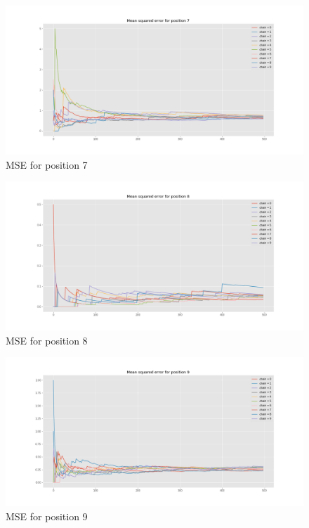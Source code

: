 \documentclass[]{article}
\begin{document}
\begin{figure}[H]
	\begin{center}
		
		\includegraphics[width=1\textwidth]{task4/figures/T_2_4/Q2/mse_pos7.png}
		\caption*{MSE for position 7}
	\end{center}
\end{figure}

\begin{figure}[H]
	\begin{center}
		
		\includegraphics[width=1\textwidth]{task4/figures/T_2_4/Q2/mse_pos8.png}
		\caption*{MSE for position 8}
	\end{center}
\end{figure}

\begin{figure}[H]
	\begin{center}
		
		\includegraphics[width=1\textwidth]{task4/figures/T_2_4/Q2/mse_pos9.png}
		\caption*{MSE for position 9}
	\end{center}
\end{figure}
\end{document}
